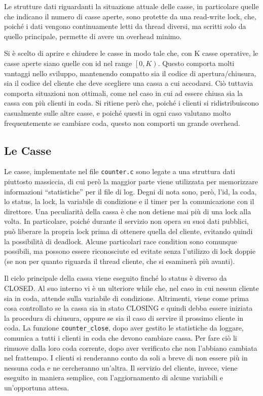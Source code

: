 \documentclass[a4paper,11pt] {article}
\begin{document}
Le strutture dati riguardanti la situazione attuale delle casse, in particolare quelle che indicano il numero di casse aperte, sono protette da una read-write lock, che, poiché i dati vengono continuamente letti da thread diversi, ma scritti solo da quello principale, permette di avere un overhead minimo.

Si è scelto di aprire e chiudere le casse in modo tale che, con K casse operative, le casse aperte siano quelle con id nel range $\left[0,K\right)$. Questo comporta molti vantaggi nello sviluppo, mantenendo compatto sia il codice di apertura/chiusura, sia il codice del cliente che deve scegliere una cassa a cui accodarsi. Ciò tuttavia comporta situazioni non ottimali, come nel caso in cui ad essere chiusa sia la cassa con più clienti in coda. Si ritiene però che, poiché i clienti si ridistribuiscono casualmente sulle altre casse, e poiché questi in ogni caso valutano molto frequentemente se cambiare coda, questo non comporti un grande overhead.

\subsection*{Le Casse}

Le casse, implementate nel file \lstinline{counter.c} sono legate a una struttura dati piuttosto massiccia, di cui però la maggior parte viene utilizzata per memorizzare informazioni ``statistiche'' per il file di log. Degni di nota sono, però, l'id, la coda, lo status, la lock, la variabile di condizione e il timer per la comunicazione con il direttore. Una peculiarità della cassa è che non detiene mai più di una lock alla volta. In particolare, poiché durante il servizio non opera su suoi dati pubblici, può liberare la propria lock prima di ottenere quella del cliente, evitando quindi la possibilità di deadlock. Alcune particolari race condition sono comunque possibili, ma possono essere riconosciute ed evitate senza l'utilizzo di lock doppie (se non per quanto riguarda il thread cliente, che si esaminerà più avanti).

Il ciclo principale della cassa viene eseguito finché lo status è diverso da CLOSED. Al suo interno vi è un ulteriore while che, nel caso in cui nessun cliente sia in coda, attende sulla variabile di condizione. Altrimenti, viene come prima cosa controllato se la cassa sia in stato CLOSING e quindi debba essere iniziata la procedura di chiusura, oppure se sia il caso di servire il prossimo cliente in coda. La funzione \lstinline{counter_close}, dopo aver gestito le statistiche da loggare, comunica a tutti i clienti in coda che devono cambiare cassa. Per fare ciò li rimuove dalla loro coda corrente, dopo aver verificato che non l'abbiano cambiata nel frattempo. I clienti si renderanno conto da soli a breve di non essere più in nessuna coda e ne cercheranno un'altra. Il servizio del cliente, invece, viene eseguito in maniera semplice, con l'aggiornamento di alcune variabili e un'opportuna attesa.
\end{document}
